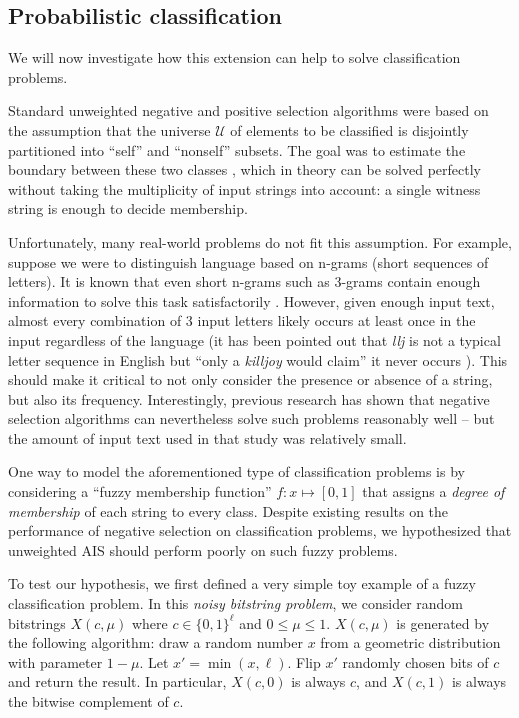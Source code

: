 \documentclass{llncs}
\begin{document}
\subsection{Probabilistic classification}

\label{sectionempirical}

We will now investigate how this extension can help to solve classification problems.

Standard unweighted negative and positive selection algorithms
were based on the assumption that the universe
$\mathcal{U}$ of elements to be classified is 
disjointly partitioned into ``self'' and ``nonself'' subsets.
The goal was to estimate the boundary between these two classes \cite{Forrest1994,Timmis2008},
which in theory can be solved perfectly without taking the multiplicity of input
strings into account: a single witness string is enough to decide
membership.

Unfortunately, many real-world problems do not fit this assumption.
For example, suppose we were to distinguish language based on n-grams (short sequences of letters).
It is known that even short n-grams such as 3-grams contain enough information
to solve this task satisfactorily \cite{Dunning1996}. However, given enough input text, almost 
every combination of 3 input letters likely occurs at least once in the input
regardless of the language (it has been pointed out that \emph{llj}
is not a typical letter sequence in English but ``only a \emph{killjoy}
would claim'' it never occurs \cite{Dunning1996}). This should make it critical to not only consider
the presence or absence of a string, but also its frequency. Interestingly, 
previous research has shown that negative selection algorithms can nevertheless 
solve such problems reasonably well \cite{Wortel2020t} -- 
but the amount of input text used in that
study was relatively small. 

One way to model the aforementioned type of classification problems is by considering
a ``fuzzy membership function'' $f: x \mapsto [0,1]$ that assigns a \emph{degree of membership}
of each string to every class. Despite existing results on the performance of 
negative selection on classification problems, we hypothesized that unweighted AIS 
should perform poorly on such fuzzy problems.

To test our hypothesis, we first defined a very simple toy example of a
fuzzy classification problem. In this \emph{noisy bitstring problem}, we consider
random bitstrings $X(c,\mu)$ where $c \in \{0,1\}^\ell$ and $0 \leq \mu \leq 1$. 
$X(c,\mu)$ is generated by the following algorithm: draw a random number
$x$ from a geometric distribution with parameter $1-\mu$. Let $x' = \min(x,\ell)$.
Flip $x'$ randomly chosen bits of $c$ and return the result.
In particular, $X(c,0)$ is always $c$, and $X(c,1)$ is always the bitwise
complement of $c$. 
\end{document}
